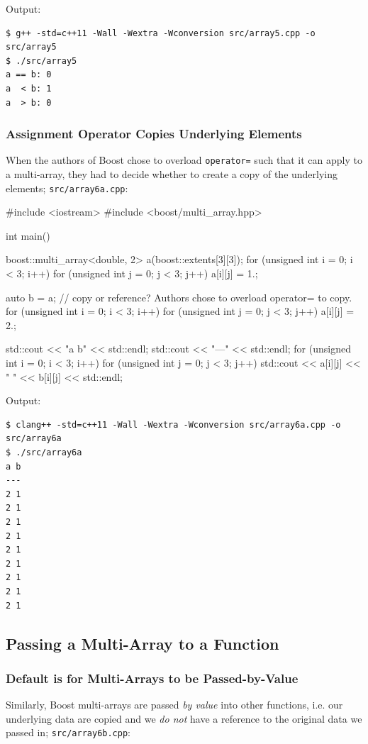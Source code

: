 \documentclass[12pt,letterpaper,twoside]{article}
\begin{document}
Output:

\begin{verbatim}
$ g++ -std=c++11 -Wall -Wextra -Wconversion src/array5.cpp -o src/array5
$ ./src/array5
a == b: 0
a  < b: 1
a  > b: 0
\end{verbatim}

\subsubsection{Assignment Operator Copies Underlying Elements} 
When the authors of Boost chose to overload \texttt{operator=} such that it can apply
to a multi-array, they had to decide whether to create a copy of the underlying elements;
\texttt{src/array6a.cpp}:

\begin{cpp}
#include <iostream>
#include <boost/multi_array.hpp>

int main() {
  boost::multi_array<double, 2> a(boost::extents[3][3]);
  for (unsigned int i = 0; i < 3; i++) {
    for (unsigned int j = 0; j < 3; j++) {
      a[i][j] = 1.;
    }
  }

  auto b = a; // copy or reference? Authors chose to overload operator= to copy.
  for (unsigned int i = 0; i < 3; i++)
    for (unsigned int j = 0; j < 3; j++)
      a[i][j] = 2.;

  std::cout << "a b" << std::endl;
  std::cout << "---" << std::endl;
  for (unsigned int i = 0; i < 3; i++)
    for (unsigned int j = 0; j < 3; j++)
      std::cout << a[i][j] << " " << b[i][j] << std::endl;
}
\end{cpp}

Output:

\begin{verbatim}
$ clang++ -std=c++11 -Wall -Wextra -Wconversion src/array6a.cpp -o src/array6a
$ ./src/array6a
a b
---
2 1
2 1
2 1
2 1
2 1
2 1
2 1
2 1
2 1
\end{verbatim}

\subsection{Passing a Multi-Array to a Function}
\subsubsection{Default is for Multi-Arrays to be Passed-by-Value}
Similarly, Boost multi-arrays are
passed \emph{by value} into other functions, i.e. our underlying data are copied and we 
\emph{do not} have a reference to the original data we passed in; 
\texttt{src/array6b.cpp}:
\end{document}
